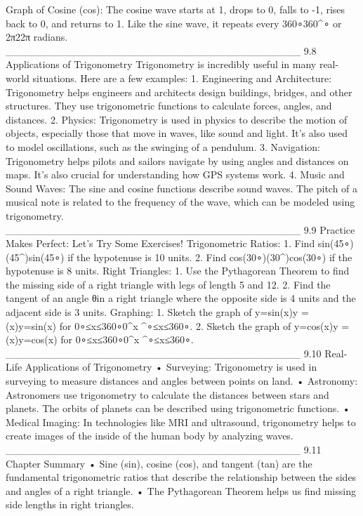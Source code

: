 Graph of Cosine (cos):
The cosine wave starts at 1, drops to 0, falls to -1, rises back to 0, and returns to 1. Like the sine wave, it repeats every 360∘360^∘ or 2π2\pi2π radians.
________________________________________
9.8 Applications of Trigonometry
Trigonometry is incredibly useful in many real-world situations. Here are a few examples:
1.	Engineering and Architecture: Trigonometry helps engineers and architects design buildings, bridges, and other structures. They use trigonometric functions to calculate forces, angles, and distances.
2.	Physics: Trigonometry is used in physics to describe the motion of objects, especially those that move in waves, like sound and light. It’s also used to model oscillations, such as the swinging of a pendulum.
3.	Navigation: Trigonometry helps pilots and sailors navigate by using angles and distances on maps. It’s also crucial for understanding how GPS systems work.
4.	Music and Sound Waves: The sine and cosine functions describe sound waves. The pitch of a musical note is related to the frequency of the wave, which can be modeled using trigonometry.
________________________________________
9.9 Practice Makes Perfect: Let’s Try Some Exercises!
Trigonometric Ratios:
1.	Find sin⁡(45∘)\sin(45^\circ)sin(45∘) if the hypotenuse is 10 units.
2.	Find cos⁡(30∘)\cos(30^\circ)cos(30∘) if the hypotenuse is 8 units.
Right Triangles:
1.	Use the Pythagorean Theorem to find the missing side of a right triangle with legs of length 5 and 12.
2.	Find the tangent of an angle θ in a right triangle where the opposite side is 4 units and the adjacent side is 3 units.
Graphing:
1.	Sketch the graph of y=sin⁡(x)y = \sin(x)y=sin(x) for 0∘≤x≤360∘0^\circ \leq x ^∘≤x≤360∘.
2.	Sketch the graph of y=cos⁡(x)y = \cos(x)y=cos(x) for 0∘≤x≤360∘0^\circ \leq x ^∘≤x≤360∘.
________________________________________
9.10 Real-Life Applications of Trigonometry
•	Surveying: Trigonometry is used in surveying to measure distances and angles between points on land.
•	Astronomy: Astronomers use trigonometry to calculate the distances between stars and planets. The orbits of planets can be described using trigonometric functions.
•	Medical Imaging: In technologies like MRI and ultrasound, trigonometry helps to create images of the inside of the human body by analyzing waves.
________________________________________
9.11 Chapter Summary
•	Sine (sin), cosine (cos), and tangent (tan) are the fundamental trigonometric ratios that describe the relationship between the sides and angles of a right triangle.
•	The Pythagorean Theorem helps us find missing side lengths in right triangles.
